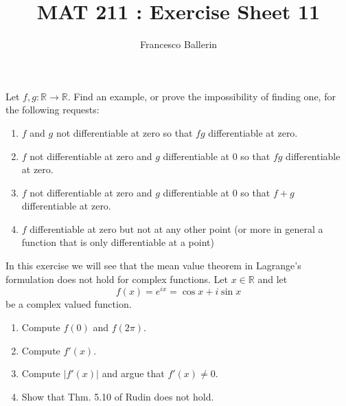 \documentclass[11pt]{article}%
\title{MAT 211 : Exercise Sheet 11}
\author{Francesco Ballerin}
\date{\color{gray}{\small{francesco.ballerin@uib.no}}}
\newcommand{\R}{\mathbb{R}}
\begin{document}
\begin{minipage}[t]{\dimexpr \textwidth-6cm-\columnsep}
     \maketitle
\end{minipage}
\hfill\noindent{}

\vspace{50pt}

\begin{Exercise}[title={*}]
	Let $f,g:\R\to\R$. Find an example, or prove the impossibility of finding one, for the following requests:
	\begin{enumerate}
		\item $f$ and $g$ not differentiable at zero so that $fg$ differentiable at zero.
		\item $f$ not differentiable at zero and $g$  differentiable at 0 so that $fg$ differentiable at zero.
		\item $f$ not differentiable at zero and $g$ differentiable at 0 so that $f+g$ differentiable at zero.
		\item $f$ differentiable at zero but not at any other point (or more in general a function that is only differentiable at a point)
	\end{enumerate}
\end{Exercise}

\begin{Exercise}[title=*]
	In this exercise we will see that the mean value theorem in Lagrange's formulation does not hold for complex functions. Let $x\in\R$ and let $$f(x)=e^{ix} = \cos x + i\sin x$$
	be a complex valued function.
	\begin{enumerate}
		\item Compute $f(0)$ and $f(2\pi)$.
		\item Compute $f'(x)$.
		\item Compute $\lvert f'(x) \rvert$ and argue that $f'(x)\neq 0$.
		\item Show that Thm. 5.10 of Rudin does not hold.
	\end{enumerate}
\end{Exercise}
\end{document}

